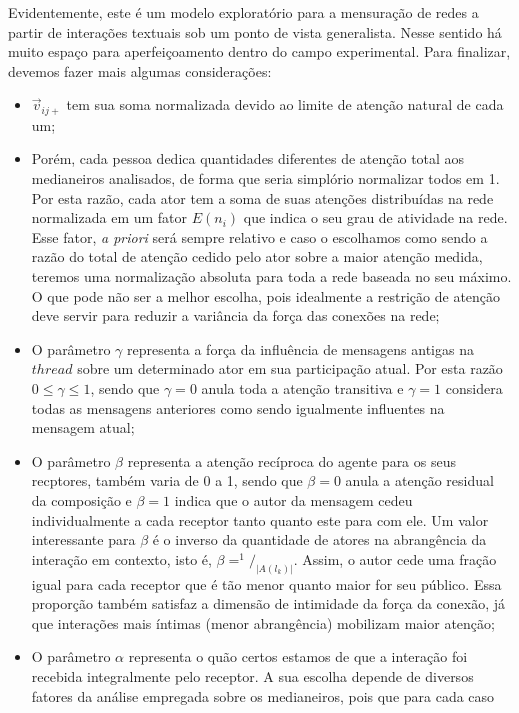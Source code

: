 Evidentemente, este é um modelo exploratório para a mensuração de redes a partir
de interações textuais sob um ponto de vista generalista. Nesse sentido há muito
espaço para aperfeiçoamento dentro do campo experimental. Para finalizar,
devemos fazer mais algumas considerações:
\begin{itemize}
  \item $\vec{v}_{ij+}$ tem sua soma normalizada devido ao limite de atenção
  natural de cada um;
  \item Porém, cada pessoa dedica quantidades diferentes de atenção total aos
  medianeiros analisados, de forma que seria simplório normalizar todos em 1.
  Por esta razão, cada ator tem a soma de suas atenções distribuídas na rede
  normalizada em um fator $E(n_i)$ que indica o seu grau de atividade na rede.
  Esse fator, \emph{a priori} será sempre relativo e caso o escolhamos como
  sendo a razão do total de atenção cedido pelo ator sobre a maior atenção
  medida, teremos uma normalização absoluta para toda a rede baseada no seu
  máximo. O que pode não ser a melhor escolha, pois idealmente a restrição de
  atenção deve servir para reduzir a variância da força das conexões na rede;
  \item O parâmetro $\gamma$ representa a força da influência de mensagens
  antigas na $thread$ sobre um determinado ator em sua participação atual. Por
  esta razão $0 \leq \gamma \leq 1$, sendo que $\gamma=0$ anula toda a atenção
  transitiva e $\gamma=1$ considera todas as mensagens anteriores como sendo
  igualmente influentes na mensagem atual;
  \item O parâmetro $\beta$ representa a atenção recíproca do agente para os
  seus recptores, também varia de 0 a 1, sendo que $\beta=0$ anula a atenção
  residual da composição e $\beta=1$ indica que o autor da mensagem cedeu
  individualmente a cada receptor tanto quanto este para com ele. Um valor
  interessante para $\beta$ é o inverso da quantidade de atores na abrangência
  da interação em contexto, isto é, $\beta=^1/_{|A(l_k)|}$. Assim, o autor cede
  uma fração igual para cada receptor que é tão menor quanto maior for seu
  público. Essa proporção também satisfaz a dimensão de intimidade da força da
  conexão, já que interações mais íntimas (menor abrangência) mobilizam maior
  atenção;
  \item O parâmetro $\alpha$ representa o quão certos estamos de que a interação
  foi recebida integralmente pelo receptor. A sua escolha depende de diversos
  fatores da análise empregada sobre os medianeiros, pois que para cada caso

\end{itemize}
